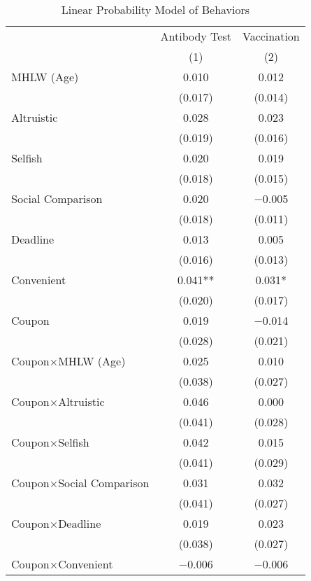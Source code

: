 \begin{table}

\caption{Linear Probability Model of Behaviors \label{tab:act2-reg}}
\centering
\fontsize{9}{11}\selectfont
\begin{threeparttable}
\begin{tabular}[t]{lcc}
\toprule
\multicolumn{1}{c}{ } & \multicolumn{1}{c}{Antibody Test} & \multicolumn{1}{c}{Vaccination} \\
\cmidrule(l{3pt}r{3pt}){2-2} \cmidrule(l{3pt}r{3pt}){3-3}
  & (1) & (2)\\
\midrule
MHLW (Age) & \num{0.010} & \num{0.012}\\
 & (\num{0.017}) & (\num{0.014})\\
Altruistic & \num{0.028} & \num{0.023}\\
 & (\num{0.019}) & (\num{0.016})\\
Selfish & \num{0.020} & \num{0.019}\\
 & (\num{0.018}) & (\num{0.015})\\
Social Comparison & \num{0.020} & \num{-0.005}\\
 & (\num{0.018}) & (\num{0.011})\\
Deadline & \num{0.013} & \num{0.005}\\
 & (\num{0.016}) & (\num{0.013})\\
Convenient & \num{0.041}** & \num{0.031}*\\
 & (\num{0.020}) & (\num{0.017})\\
Coupon & \num{0.019} & \num{-0.014}\\
 & (\num{0.028}) & (\num{0.021})\\
Coupon×MHLW (Age) & \num{0.025} & \num{0.010}\\
 & (\num{0.038}) & \vphantom{1} (\num{0.027})\\
Coupon×Altruistic & \num{0.046} & \num{0.000}\\
 & (\num{0.041}) & (\num{0.028})\\
Coupon×Selfish & \num{0.042} & \num{0.015}\\
 & (\num{0.041}) & (\num{0.029})\\
Coupon×Social Comparison & \num{0.031} & \num{0.032}\\
 & (\num{0.041}) & (\num{0.027})\\
Coupon×Deadline & \num{0.019} & \num{0.023}\\
 & (\num{0.038}) & (\num{0.027})\\
Coupon×Convenient & \num{-0.006} & \num{-0.006}\\

\end{tabular}
\end{threeparttable}
\end{table}
